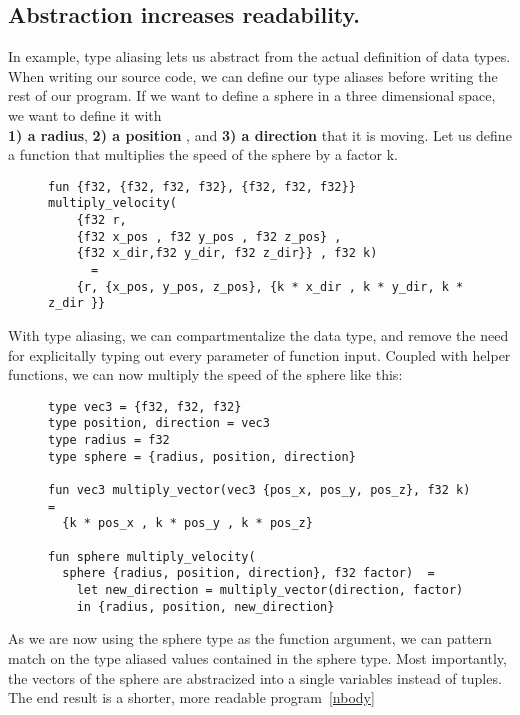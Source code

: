 \subsection{Abstraction increases readability.} 
In example, type aliasing lets us abstract
from the actual definition of data types.
When writing our source code, we can define our type aliases before writing the
rest of our program.
If we want to define a sphere in a three dimensional space, we want to define it
with \\
\textbf{1) a radius}, \textbf{2) a position} , and \textbf{3) a direction} that it is
moving. 
Let us define a function that multiplies the speed of the sphere by a factor k.
\begin{figure}[h]
\begin{lstlisting}
fun {f32, {f32, f32, f32}, {f32, f32, f32}} multiply_velocity(
	{f32 r, 
	{f32 x_pos , f32 y_pos , f32 z_pos} , 
	{f32 x_dir,f32 y_dir, f32 z_dir}} , f32 k) 
	  =
    {r, {x_pos, y_pos, z_pos}, {k * x_dir , k * y_dir, k * z_dir }}
\end{lstlisting}
\end{figure}
\clearpage
\noindent
With type aliasing, we can compartmentalize the data type, and remove the need
for explicitally typing out every parameter of function input.
Coupled with helper functions, we can now multiply the speed of the sphere like
this:
\begin{figure}[h]
\begin{verbatim}
type vec3 = {f32, f32, f32}
type position, direction = vec3 
type radius = f32
type sphere = {radius, position, direction}

fun vec3 multiply_vector(vec3 {pos_x, pos_y, pos_z}, f32 k) =
  {k * pos_x , k * pos_y , k * pos_z}

fun sphere multiply_velocity(
  sphere {radius, position, direction}, f32 factor)  =
    let new_direction = multiply_vector(direction, factor)
    in {radius, position, new_direction}
\end{verbatim}
\end{figure}

\noindent As we are now using the sphere type as the function argument, we can pattern
match on the type aliased values contained in the sphere type.
Most importantly, the vectors of the sphere are abstracized into a single variables
instead of tuples.
\\
The end result is a shorter, more readable program~\ref{nbody}

